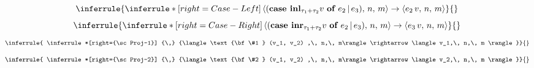 \documentclass{article}
\begin{document}
\begin{multicols}{2}
				\begin{equation*}
				\inferrule{
				\inferrule*[right={\sc Case-Left}]
				{\,}
				{\langle (\text{\bf case } {\bf inl}_{\tau_1 + \tau_2} v \text{ \bf of } e_2 \,|\, e_3) ,\, n,\, m\rangle \rightarrow \langle e_2\, v,\, n,\, m \rangle}}
				{}
			\end{equation*}
				\begin{equation*}
				\inferrule{
				\inferrule*[right={\sc Case-Right}]
				{\,}
				{\langle (\text{\bf case } {\bf inr}_{\tau_1 + \tau_2} v \text{ \bf of } e_2 \,|\, e_3) ,\, n,\, m\rangle \rightarrow \langle e_3\, v,\, n,\, m \rangle}}
				{}
			\end{equation*}
				\begin{equation*}
				\inferrule{
				\inferrule*[right={\sc Proj-1}]
				{\,}
				{\langle \text{\bf \#1 } (v_1, v_2) ,\, n,\, m\rangle \rightarrow \langle v_1,\, n,\, m \rangle}}
				{}
			\end{equation*}
				\begin{equation*}
				\inferrule{
				\inferrule*[right={\sc Proj-2}]
				{\,}
				{\langle \text{\bf \#2 } (v_1, v_2) ,\, n,\, m\rangle \rightarrow \langle v_2,\, n,\, m \rangle}}
				{}
			\end{equation*}
		\end{multicols}
\end{document}
